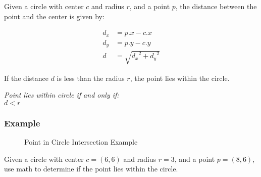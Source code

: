 Given a circle with center $c$ and radius $r$, and a point $p$, the distance
between the point and the center is given by:

\begin{equation}
    \begin{aligned}
        d_x & = p.x - c.x                \\
        d_y & = p.y - c.y                \\
        d   & = \sqrt{{d_x}^2 + {d_y}^2}
    \end{aligned}
\end{equation}

If the distance $d$ is less than the radius $r$, the point lies within the
circle.

\begin{center}
    \textit{Point lies within circle if and only if:}\\
    $d < r$
\end{center}

\subsubsection{Example}
\begin{figure}[H]
    \begin{center}
    \end{center}
    \caption{Point in Circle Intersection Example}

\end{figure}

Given a circle with center $c = (6, 6)$ and radius $r = 3$, and a point $p =
    (8, 6)$, use math to determine if the point lies within the circle.

